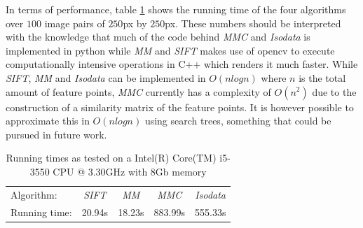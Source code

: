 \documentclass[conference]{IEEEtran}
\begin{document}
In terms of performance, table \ref{table:running_times} shows the 
running time of the four algorithms over $100$ image pairs of $250$px by 
$250$px. These numbers should be interpreted with the knowledge that 
much of the code behind \emph{MMC} and \emph{Isodata} is implemented in 
python while \emph{MM} and \emph{SIFT} makes use of opencv to execute 
computationally intensive operations in C++ which renders it much 
faster. While \emph{SIFT}, \emph{MM} and \emph{Isodata} can be 
implemented in $O(nlogn)$ where $n$ is the total amount of feature 
points, \emph{MMC} currently has a complexity of $O(n^2)$ due to the 
construction of a similarity matrix of the feature points. It is however 
possible to approximate this in $O(nlogn)$ using search trees, something 
that could be pursued in future work.
%
\begin{table}
	\centering
	\small
\begin{tabular}{l*{4}{c}}
	Algorithm: & \emph{SIFT} & \emph{MM} & \emph{MMC} & \emph{Isodata} 
	\\
	\noalign{\smallskip} 
	Running time: & 20.94s & 18.23s & 883.99s & 555.33s \\
\end{tabular}
\caption{Running times as tested on a Intel(R) Core(TM) i5-3550 CPU @ 
3.30GHz with 8Gb memory}
\label{table:running_times}
\end{table}
%
\end{document}

